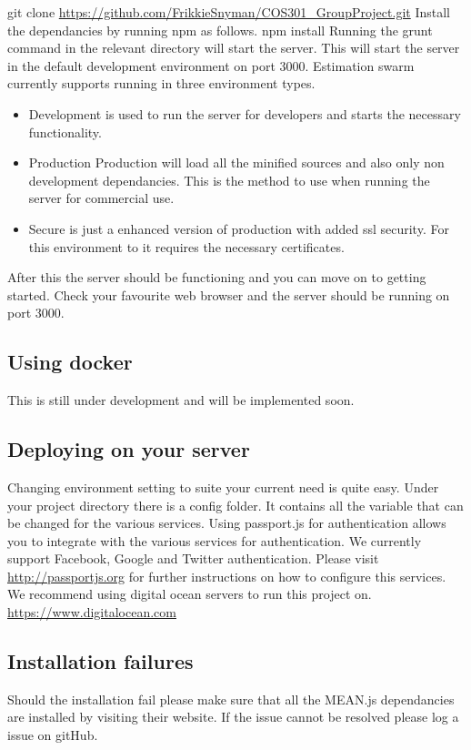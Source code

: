 git clone \url{https://github.com/FrikkieSnyman/COS301_GroupProject.git}
\newline
Install the dependancies by running npm as follows.
\newline
npm install
\newline
Running the grunt command in the relevant directory will start the server. This will start the server in the default development environment on port 3000. Estimation swarm currently supports running in three environment types.
\begin{itemize}
	\item{Development} is used to run the server for developers and starts the necessary functionality.
	\item{Production}
	Production will load all the minified sources and also only non development dependancies. This is the method to use when running the server for commercial use.
	\item{Secure} is just a enhanced version of production with added ssl security. For this environment to it requires the necessary certificates.
\end{itemize}
After this the server should be functioning and you can move on to getting started. Check your favourite web browser and the server should be running on port 3000.
\subsection{Using docker}
This is still under development and will be implemented soon.
\subsection{Deploying on your server}
Changing environment setting to suite your current need is quite easy. Under your project directory there is a config folder. It contains all the variable that can be changed for the various services. Using passport.js for authentication allows you to integrate with the various services for authentication. We currently support Facebook, Google and Twitter authentication. Please visit \url{http://passportjs.org} for further instructions on how to configure this services. We recommend using digital ocean servers to run this project on. \url{https://www.digitalocean.com}

\subsection{Installation failures}
Should the installation fail please make sure that all the MEAN.js dependancies are installed by visiting their website. If the issue cannot be resolved please log a issue on gitHub.